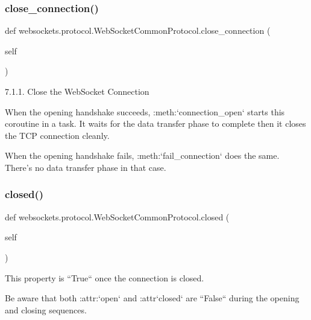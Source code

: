 \subsubsection{\texorpdfstring{close\+\_\+connection()}{close\_connection()}}
{\footnotesize\ttfamily def websockets.\+protocol.\+Web\+Socket\+Common\+Protocol.\+close\+\_\+connection (\begin{DoxyParamCaption}\item[{}]{self }\end{DoxyParamCaption})}

\begin{DoxyVerb}7.1.1. Close the WebSocket Connection

When the opening handshake succeeds, :meth:`connection_open` starts
this coroutine in a task. It waits for the data transfer phase to
complete then it closes the TCP connection cleanly.

When the opening handshake fails, :meth:`fail_connection` does the
same. There's no data transfer phase in that case.\end{DoxyVerb}
 \mbox{\label{classwebsockets_1_1protocol_1_1_web_socket_common_protocol_a52bc1f93413a8480ae83af00848d89f6}} 
\subsubsection{\texorpdfstring{closed()}{closed()}}
{\footnotesize\ttfamily def websockets.\+protocol.\+Web\+Socket\+Common\+Protocol.\+closed (\begin{DoxyParamCaption}\item[{}]{self }\end{DoxyParamCaption})}

\begin{DoxyVerb}This property is ``True`` once the connection is closed.

Be aware that both :attr:`open` and :attr`closed` are ``False`` during
the opening and closing sequences.\end{DoxyVerb}
 \mbox{\label{classwebsockets_1_1protocol_1_1_web_socket_common_protocol_a726b03e5dfb763929cd619a768b7acd0}} 
